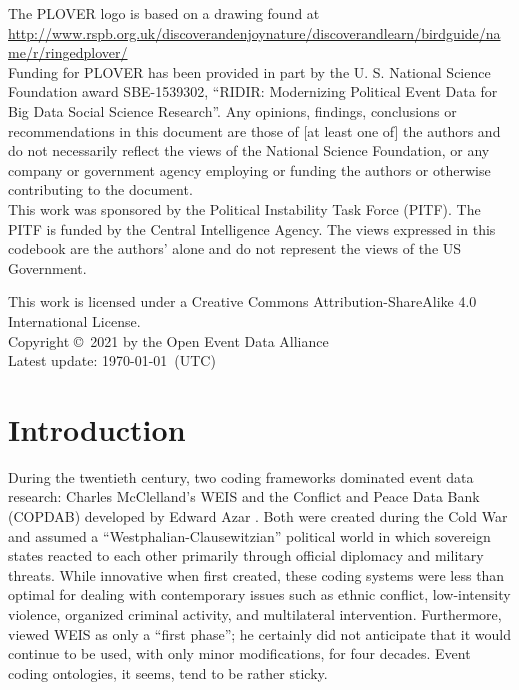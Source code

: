 \documentclass[11pt]{report}
\begin{document}
\noindent The PLOVER logo is based on a drawing found at\\ \url{http://www.rspb.org.uk/discoverandenjoynature/discoverandlearn/birdguide/name/r/ringedplover/}\\

\noindent Funding for PLOVER has been provided in part by the U. S. National Science Foundation award SBE-1539302, ``RIDIR: Modernizing Political Event Data for Big Data Social Science Research''. Any opinions, findings, conclusions or recommendations in this document are those of [at least one of] the authors and do not necessarily reflect the views of the National Science Foundation, or any company or government agency employing or funding the authors or otherwise contributing to the document.\\

\noindent This work was sponsored by
the Political Instability Task Force (PITF). The PITF is
funded by the Central Intelligence Agency. The views
expressed in this codebook are the authors' alone and do not
represent the views of the US Government.


\noindent This work is licensed under a Creative Commons Attribution-ShareAlike 4.0 International License.\\

\noindent  Copyright \copyright ~2021 by the Open Event Data Alliance \\

\noindent Latest update: \today~(UTC)


\chapter{Introduction}

During the twentieth century, two coding frameworks dominated event data research: Charles McClelland's WEIS \citep{McClelland67,McClelland76}  and the Conflict and Peace Data Bank (COPDAB) developed by Edward Azar \citep{AzarSloan75, Azar80, Azar82}. Both were created during the Cold War and assumed a ``Westphalian-Clausewitzian'' political world in which sovereign states reacted to each other primarily through official diplomacy
and military threats. While innovative when first created, these coding systems were less than optimal for dealing with contemporary issues such as ethnic conflict, low-intensity violence, organized criminal activity, and multilateral intervention. Furthermore, \citet[pg. 177]{McClelland83} viewed WEIS as only a ``first phase''; he certainly did not anticipate that it would continue to be used, with only minor modifications, for four decades. Event coding ontologies, it seems, tend to be rather sticky.
\end{document}
